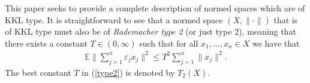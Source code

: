 This paper seeks to provide a complete description of normed spaces which are of KKL type.  It is straightforward to see that a normed space  $(X, \|\cdot \|)$ that is of KKL type must also be of \textit{Rademacher type 2} (or just type 2), meaning that there exists a constant $T\in (0,\infty)$ such that for all $x_1,...,x_n \in X$ we have that
\begin{align}\label{type2}
\mathbb{E}\Big\| \sum_{j=1}^{n} \varepsilon_{j} x_{j} \Big\|^{2} \leq T^{2}  \sum_{j=1}^{n} \|x_j\|^2.
\end{align}
The best constant $T$ in (\ref{type2}) is denoted by $T_{2}(X)$. 
